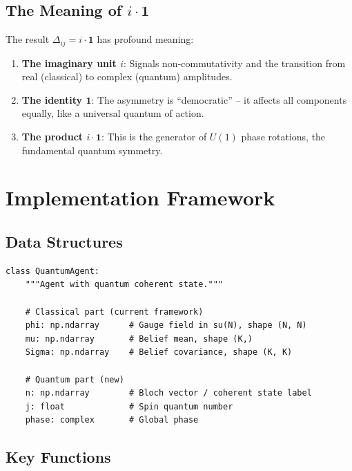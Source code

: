 \documentclass[11pt,a4paper]{article}
\newcommand{\id}{\mathbf{1}}
\begin{document}
\subsection{The Meaning of $i \cdot \id$}

The result $\Delta_{ij} = i \cdot \id$ has profound meaning:

\begin{enumerate}
    \item \textbf{The imaginary unit $i$}: Signals non-commutativity and the transition from real (classical) to complex (quantum) amplitudes.

    \item \textbf{The identity $\id$}: The asymmetry is ``democratic'' -- it affects all components equally, like a universal quantum of action.

    \item \textbf{The product $i \cdot \id$}: This is the generator of $U(1)$ phase rotations, the fundamental quantum symmetry.
\end{enumerate}

\section{Implementation Framework}

\subsection{Data Structures}

\begin{verbatim}
class QuantumAgent:
    """Agent with quantum coherent state."""

    # Classical part (current framework)
    phi: np.ndarray      # Gauge field in su(N), shape (N, N)
    mu: np.ndarray       # Belief mean, shape (K,)
    Sigma: np.ndarray    # Belief covariance, shape (K, K)

    # Quantum part (new)
    n: np.ndarray        # Bloch vector / coherent state label
    j: float             # Spin quantum number
    phase: complex       # Global phase
\end{verbatim}

\subsection{Key Functions}
\end{document}
